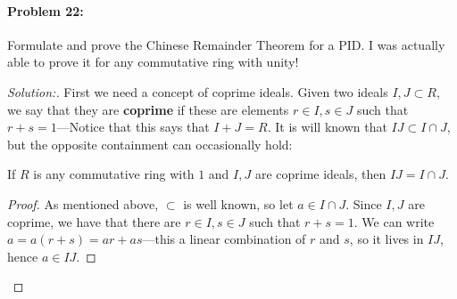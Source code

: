 \paragraph{Problem 22:}  Formulate and prove the Chinese Remainder Theorem for a
PID. I was actually able to prove it for any commutative ring with unity!

\begin{proof}[Solution:]
  First we need a concept of coprime ideals. Given two ideals \(I,J \subset R\),
  we say that they are \textbf{coprime} if these are elements
  \(r \in I, s \in J\) such that \(r+s = 1\)---Notice that this says that
  \(I+J = R\). It is will known that \(IJ \subset I \cap J\), but the opposite
  containment can occasionally hold:

  \begin{nlemma}
    If \(R\) is any commutative ring with \(1\)  and \(I,J\) are coprime ideals,
    then \(IJ = I \cap J\).
  \end{nlemma}

  \begin{proof}
    As mentioned above, \(\subset\) is well known, so let \(a \in I \cap J\).
    Since \(I,J\) are coprime, we have that there are \(r\in I, s \in J\) such
    that \(r+s=1\). We can write \(a=a(r+s)=ar+as\)---this a linear combination
    of \(r\) and \(s\), so it lives in \(IJ\), hence \(a \in IJ\).
  \end{proof}


\end{proof}

